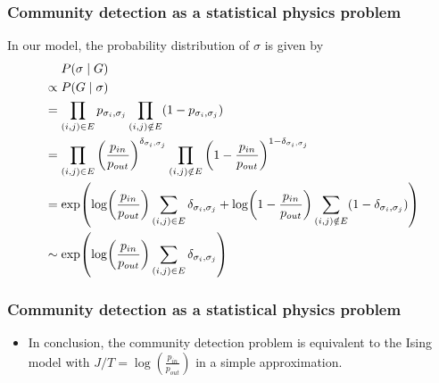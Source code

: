 \documentclass[dvipdfmx,11pt]{beamer}
\begin{document}
\begin{frame}
  \frametitle{Community detection as a statistical physics problem}
  In our model, the probability distribution of $\sigma$ is given by
  \begin{align*}
    & ~~~~ P(\sigma \mid G) \\
    &\propto P(G \mid \sigma) \\
    & = \prod_{(i, j) \in E}  p_{\sigma_i, \sigma_j} \prod_{(i, j) \notin E} (1 - p_{\sigma_i, \sigma_j}) \\
    & = \prod_{(i,j) \in E} \qty(\frac{p_{in}}{p_{out}})^{\delta_{\sigma_i, \sigma_j}} \prod_{(i, j) \notin E}   \qty(1 - \frac{p_{in}}{p_{out}})^{1 - \delta_{\sigma_i, \sigma_j}} \\
    & = \exp(\log(\frac{p_{in}}{p_{out}}) \sum_{(i, j) \in E}  \delta_{\sigma_i, \sigma_j} + \log(1 - \frac{p_{in}}{p_{out}}) \sum_{(i, j) \notin E}  (1 - \delta_{\sigma_i, \sigma_j})) \\
    & \sim \exp(\log(\frac{p_{in}}{p_{out}}) \sum_{(i, j) \in E}  \delta_{\sigma_i, \sigma_j} )
  \end{align*}
\end{frame}

\begin{frame}
  \frametitle{Community detection as a statistical physics problem}
  \begin{itemize}
    \item In conclusion, the community detection problem is equivalent to the Ising model with $J/T = \log(\frac{p_{in}}{p_{out}})$ in a simple approximation.
  \end{itemize}
\end{frame}
\end{document}
